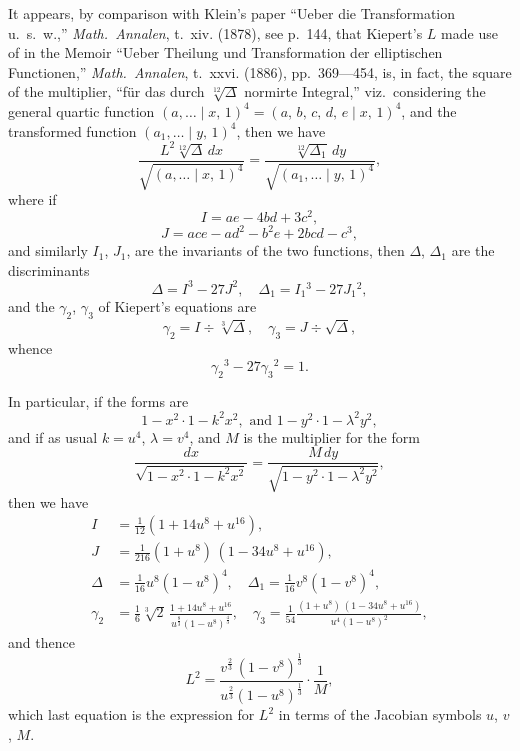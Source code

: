 \documentclass[12pt,a4paper]{article}
\theoremstyle{definition}
\begin{document}
It appears, by comparison with Klein's paper ``Ueber die Transformation u.~s.~w.,''
\textit{Math.\ Annalen}, t.~xiv. (1878), see p.~144, that Kiepert's $L$ made use of in the
Memoir ``Ueber Theilung und Transformation der elliptischen Functionen,''
\textit{Math.\ Annalen}, t.~xxvi. (1886), pp.~369---454, is, in fact, the square of the multiplier,
``f\"ur das durch $\sqrt[12]{\Delta}$ normirte Integral,'' viz.\ considering the general quartic function
$(a, \ldots \mid x,\, 1)^4 = (a,\, b,\, c,\, d,\, e \mid x,\, 1)^4$, and the transformed function
$(a_1, \ldots \mid y,\, 1)^4$, then we have
\[
\frac{L^2 \sqrt[12]{\Delta}\, dx}{\sqrt{(a, \ldots \mid x,\, 1)^4}}
= \frac{\sqrt[12]{\Delta_1}\, dy}{\sqrt{(a_1, \ldots \mid y,\, 1)^4}},
\]
where if
\[
I = ae - 4bd + 3c^2,
\]
\[
J = ace - ad^2 - b^2e + 2bcd - c^3,
\]
and similarly $I_1$, $J_1$, are the invariants of the two functions, then $\Delta$, $\Delta_1$ are the
discriminants
\[
\Delta = I^3 - 27J^2, \quad \Delta_1 = I_1{}^3 - 27J_1{}^2,
\]
and the $\gamma_2$, $\gamma_3$ of Kiepert's equations are
\[
\gamma_2 = I \div \sqrt[3]{\Delta}, \quad \gamma_3 = J \div \sqrt{\Delta},
\]
whence
\[
\gamma_2{}^3 - 27\gamma_3{}^2 = 1.
\]

In particular, if the forms are
\[
1 - x^2 \cdot 1 - k^2x^2, \text{ and } 1 - y^2 \cdot 1 - \lambda^2 y^2,
\]
and if as usual $k = u^4$, $\lambda = v^4$, and $M$ is the multiplier for the form
\[
\frac{dx}{\sqrt{1 - x^2 \cdot 1 - k^2x^2}}
= \frac{M\, dy}{\sqrt{1 - y^2 \cdot 1 - \lambda^2 y^2}},
\]
then we have
\begin{align*}
I &= \tfrac{1}{12} (1 + 14u^8 + u^{16}),\\
J &= \tfrac{1}{216} (1 + u^8)\, (1 - 34u^8 + u^{16}),\\
\Delta &= \tfrac{1}{16} u^8 (1 - u^8)^4, \quad
\Delta_1 = \tfrac{1}{16} v^8 (1 - v^8)^4,\\
\gamma_2 &= \tfrac{1}{6} \sqrt[3]{2}\,
\frac{1 + 14u^8 + u^{16}}{u^{\frac{8}{3}} (1 - u^8)^{\frac{4}{3}}}, \quad
\gamma_3 = \tfrac{1}{54}
\frac{(1 + u^8)\, (1 - 34u^8 + u^{16})}{u^4 (1 - u^8)^2},
\end{align*}
and thence
\[
L^2 = \frac{v^{\frac{2}{3}}\, (1 - v^8)^{\frac{1}{3}}}{u^{\frac{2}{3}} (1 - u^8)^{\frac{1}{3}}} \cdot \frac{1}{M},
\]
which last equation is the expression for $L^2$ in terms of the Jacobian symbols $u$, $v$, $M$.
\end{document}
